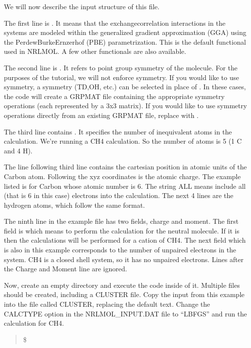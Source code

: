 \documentclass[letterpaper,10pt,english,openany,oneside]{sphinxmanual}
\begin{document}
\sphinxAtStartPar
We will now describe the input structure of this file.

\sphinxAtStartPar
The first line is .
It means that the exchange\sphinxhyphen{}correlation interactions in the systems are modeled within the generalized gradient approximation (GGA)
using the Perdew\sphinxhyphen{}Burke\sphinxhyphen{}Ernzerhof (PBE) parametrization. This is the default functional used in NRLMOL. A few other functionals are
also available.

\sphinxAtStartPar
The second line is  .
It refers to point group symmetry of the molecule. For the purposes of the tutorial, we will not enforce symmetry. If you would
like to use symmetry, a symmetry (TD,OH, etc.) can be selected in place of . In these cases, the code will create a GRPMAT
file containing the appropriate symmetry operations (each represented by a 3x3 matrix).  If you would like to use symmetry operations
directly from an existing GRPMAT file, replace  with .

\sphinxAtStartPar
The third line contains .
It specifies the number of inequivalent atoms in the calculation. We’re running a CH4 calculation. So the number of atoms is 5 (1 C and 4 H).

\sphinxAtStartPar
The line following third line contains the cartesian position in atomic units of the Carbon atom. Following the xyz coordinates is the atomic charge. The example listed is for Carbon whose atomic number is 6. The string ALL means include all
(that is 6 in this case) electrons into the calculation.
The next 4 lines are the hydrogen atoms, which follow the same format.

\sphinxAtStartPar
The ninth line in the example file has two fields, charge and moment. The first field is  which means to perform the calculation for the neutral molecule.
If it is  then the calculations will be performed for a cation of CH4. The next field which is also 
in this example corresponds to the number of unpaired electrons in the system. CH4 is a closed shell system, so it has no unpaired electrons.
Lines after the Charge and Moment line are ignored.

\sphinxAtStartPar
Now, create an empty directory and execute the code inside of it. Multiple files should be created, including a CLUSTER file. Copy the input from this example into the file called CLUSTER, replacing the default text.
Change the CALCTYPE option in the NRLMOL\_INPUT.DAT file to “LBFGS” and run the calculation for CH4.
\begin{quote}

\sphinxAtStartPar
\$ 
\end{quote}
\end{document}
